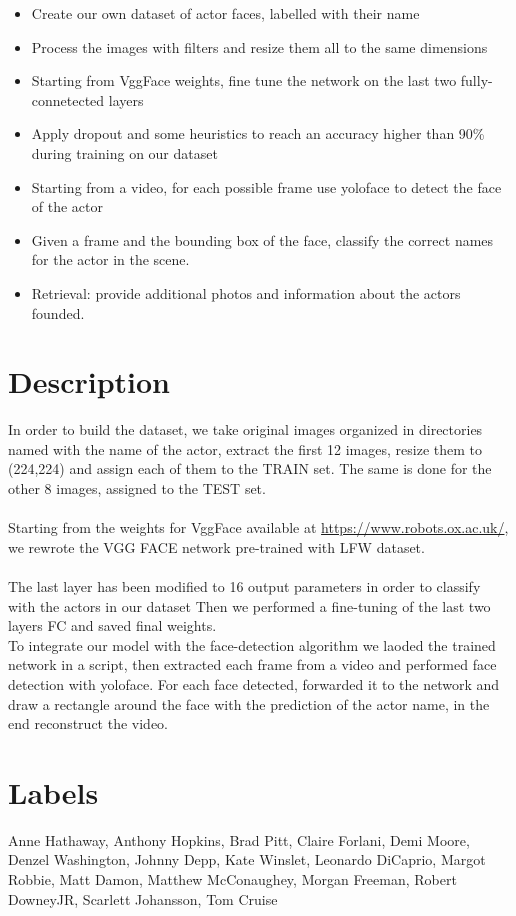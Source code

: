 \documentclass{article}
\begin{document}
\begin{itemize}
  \item Create our own dataset of actor faces, labelled with their name
  \item Process the images with filters and resize them all to the same dimensions
  \item Starting from VggFace weights, fine tune the network on the last two fully-connetected layers
  \item Apply dropout and some heuristics to reach an accuracy higher than 90\% during training on our dataset
  \item Starting from a video, for each possible frame use yoloface to detect the face of the actor
  \item Given a frame and the bounding box of the face, classify the correct names for the actor in the scene.
  \item Retrieval: provide additional photos and information about the actors founded.
\end{itemize}

\section{Description}
In order to build the dataset, we take original images organized in directories named with the name of the actor,
extract the first 12 images, resize them to (224,224) and assign each of them to the TRAIN set.
The same is done for the other 8 images, assigned to the TEST set.
\\\\
Starting from the weights for VggFace available at \href{https://www.robots.ox.ac.uk/}{https://www.robots.ox.ac.uk/}, 
we rewrote the VGG FACE network pre-trained with LFW dataset.
\\\\
The last layer has been modified to 16 output parameters in order to classify with the actors in our dataset
Then we performed a fine-tuning of the last two layers FC and saved final weights.
\\
To integrate our model with the face-detection algorithm we laoded the trained network in a script, then extracted each frame from a video
and performed face detection with yoloface.
For each face detected, forwarded it to the network and draw a rectangle around the face with the prediction of the actor name,
in the end reconstruct the video.
\section{Labels}
Anne Hathaway,
Anthony Hopkins,
Brad Pitt,
Claire Forlani,
Demi Moore,
Denzel Washington,
Johnny Depp,
Kate Winslet,
Leonardo DiCaprio,
Margot Robbie,
Matt Damon,
Matthew McConaughey,
Morgan Freeman,
Robert DowneyJR,
Scarlett Johansson,
Tom Cruise
\end{document}
